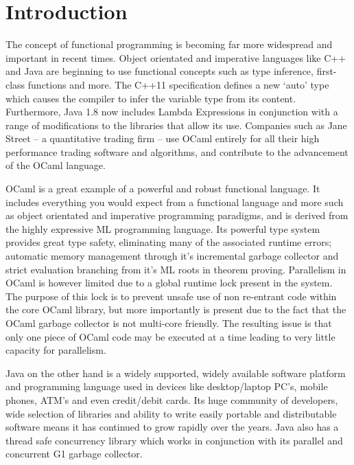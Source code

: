 \section{Introduction}
\label{sec:introduction}
The concept of functional programming is becoming far more widespread and important in recent times. Object orientated and imperative languages like C++ and Java are beginning to use functional concepts such as type inference, first-class functions and more. The C++11 specification defines a new `auto' type which causes the compiler to infer the variable type from its content\cite{web:autokeyword}. Furthermore, Java 1.8 now includes Lambda Expressions in conjunction with a range of modifications to the libraries that allow its use\cite{web:javalambda}. Companies such as Jane Street -- a quantitative trading firm -- use OCaml entirely for all their high performance trading software and algorithms\cite{web:janestreettech}, and contribute to the advancement of the OCaml language.

OCaml is a great example of a powerful and robust functional language. It includes everything you would expect from a functional language and more such as object orientated and imperative programming paradigms, and is derived from the highly expressive ML programming language. Its powerful type system provides great type safety, eliminating many of the associated runtime errors; automatic memory management through it's incremental garbage collector and strict evaluation branching from it's ML roots in theorem proving. Parallelism in OCaml is however limited due to a global runtime lock present in the system. The purpose of this lock is to prevent unsafe use of non re-entrant code within the core OCaml library, but more importantly is present due to the fact that the OCaml garbage collector is not multi-core friendly\cite{clerc2012}. The resulting issue is that only one piece of OCaml code may be executed at a time leading to very little capacity for parallelism.

Java on the other hand is a widely supported, widely available software platform and programming language used in devices like desktop/laptop PC's, mobile phones, ATM's and even credit/debit cards\cite{web:aboutjava}. Its huge community of developers, wide selection of libraries and ability to write easily portable and distributable software means it has continued to grow rapidly over the years. Java also has a thread safe concurrency library which works in conjunction with its parallel and concurrent G1 garbage collector.

